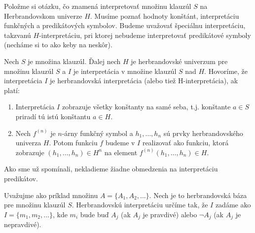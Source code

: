 Položme si otázku, čo znamená interpretovať množinu klauzúl $S$ na
Herbrandovskom univerze $H$. Musíme poznať hodnoty konštánt,
interpretáciu funkčných a predikátových symbolov. Budeme uvažovať
špeciálnu interpretáciu, takzvanú $H$-interpretáciu, pri ktorej
nebudeme interpretovať predikátové symboly (necháme si to ako keby na
neskôr).

\begin{definicia}[H-interpretácia]
    Nech $S$ je množina klauzúl. Ďalej nech $H$ je herbrandovské
    univerzum pre množinu klauzúl $S$ a $I$ je interpretácia v množine
    klauzúl $S$ nad $H$.
    Hovoríme, že interpretácia $I$ je herbrandovská interpretácia 
    (alebo tiež H-interpretácia), ak platí: 

    \begin{enumerate}
	\item Interpretácia $I$ zobrazuje všetky konštanty na samé
            seba, t.j. konštante $a \in S$ priradí tú istú konštantu $a \in H$.

	\item Nech $f^{(n)}$ je $n$-árny funkčný symbol a
            $h_1, \dots, h_n$ sú prvky herbrandovského univerza $H$.
            Potom funkciu $f$ budeme v $I$ realizovať ako funkciu,
            ktorá zobrazuje $(h_1, \dots, h_n) \in H^n$ na element
            $f^{(n)}(h_1,\dots,h_n) \in H$.
    \end{enumerate}
\end{definicia}

\begin{poznamka}
    Ako sme už spomínali, nekladieme žiadne obmedzenia 
    na interpretáciu predikátov.

    Uvažujme ako príklad množinu $A = \{ A_1, A_2, \dots \}$.
    Nech je to herbrandovská báza pre množinu klauzúl $S$.
    Herbrandovskú interpretáciu určíme tak, že $I$ zadáme ako
    $I=\{ m_1, m_2, \ldots \}$, kde
    $m_i$ bude buď $A_j$ (ak $A_j$ je pravdivé) alebo
    $\neg A_j$ (ak $A_j$ je nepravdivé).
\end{poznamka}


